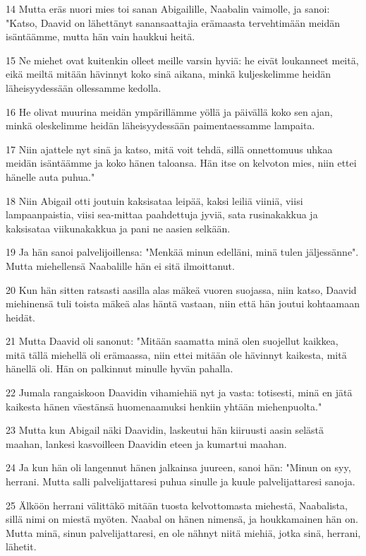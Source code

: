 \par 14 Mutta eräs nuori mies toi sanan Abigailille, Naabalin vaimolle, ja sanoi: "Katso, Daavid on lähettänyt sanansaattajia erämaasta tervehtimään meidän isäntäämme, mutta hän vain haukkui heitä.
\par 15 Ne miehet ovat kuitenkin olleet meille varsin hyviä: he eivät loukanneet meitä, eikä meiltä mitään hävinnyt koko sinä aikana, minkä kuljeskelimme heidän läheisyydessään ollessamme kedolla.
\par 16 He olivat muurina meidän ympärillämme yöllä ja päivällä koko sen ajan, minkä oleskelimme heidän läheisyydessään paimentaessamme lampaita.
\par 17 Niin ajattele nyt sinä ja katso, mitä voit tehdä, sillä onnettomuus uhkaa meidän isäntäämme ja koko hänen taloansa. Hän itse on kelvoton mies, niin ettei hänelle auta puhua."
\par 18 Niin Abigail otti joutuin kaksisataa leipää, kaksi leiliä viiniä, viisi lampaanpaistia, viisi sea-mittaa paahdettuja jyviä, sata rusinakakkua ja kaksisataa viikunakakkua ja pani ne aasien selkään.
\par 19 Ja hän sanoi palvelijoillensa: "Menkää minun edelläni, minä tulen jäljessänne". Mutta miehellensä Naabalille hän ei sitä ilmoittanut.
\par 20 Kun hän sitten ratsasti aasilla alas mäkeä vuoren suojassa, niin katso, Daavid miehinensä tuli toista mäkeä alas häntä vastaan, niin että hän joutui kohtaamaan heidät.
\par 21 Mutta Daavid oli sanonut: "Mitään saamatta minä olen suojellut kaikkea, mitä tällä miehellä oli erämaassa, niin ettei mitään ole hävinnyt kaikesta, mitä hänellä oli. Hän on palkinnut minulle hyvän pahalla.
\par 22 Jumala rangaiskoon Daavidin vihamiehiä nyt ja vasta: totisesti, minä en jätä kaikesta hänen väestänsä huomenaamuksi henkiin yhtään miehenpuolta."
\par 23 Mutta kun Abigail näki Daavidin, laskeutui hän kiiruusti aasin selästä maahan, lankesi kasvoilleen Daavidin eteen ja kumartui maahan.
\par 24 Ja kun hän oli langennut hänen jalkainsa juureen, sanoi hän: "Minun on syy, herrani. Mutta salli palvelijattaresi puhua sinulle ja kuule palvelijattaresi sanoja.
\par 25 Älköön herrani välittäkö mitään tuosta kelvottomasta miehestä, Naabalista, sillä nimi on miestä myöten. Naabal on hänen nimensä, ja houkkamainen hän on. Mutta minä, sinun palvelijattaresi, en ole nähnyt niitä miehiä, jotka sinä, herrani, lähetit.
